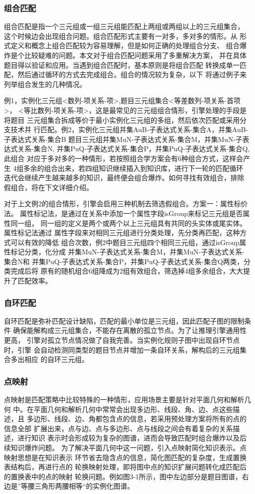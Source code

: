 \documentclass{standalone}
\begin{document}
\subsubsection{组合匹配}
组合匹配是指一个三元组或一组三元组能匹配上两组或两组以上的三元组集合，
这个时候边会出现组合问题。组合匹配形式主要有一对多，多对多的情形。从
形式定义和概念上组合匹配较为容易理解，但是如何正确的处理组合分支、
组合爆炸是个比较疑难的问题。本文对于组合匹配问题采用了多重解决方案，
并在具体题目得以验证和应用。当遇到组合匹配时，基本原则是将组合匹配
转换成单一匹配，然后通过循环的方式去完成组合。组合的情况较为复杂，以下
将通过例子来列举组合发生的几种情况。

例1，实例化三元组<数列-项关系-项>,题目三元组集合{<等差数列-项关系-首项>，
<等比数列-项关系-项>}，这是最常见的三元组组合情形，引擎处理的手段是将题目
三元组集合拆成等价于最小实例化三元组的多组，然后依次匹配或采用分支技术并
行匹配。例2，实例化三元组{并集AuB-子表达式关系-集合A，并集AuB-子表达式关系-集合B}
题目三元组{并集MuN-子表达式关系-集合M，并集MuN-子表达式关系-集合N,
并集PuQ-子表达式关系-集合P，并集PuQ-子表达式关系-集合Q},此组合
对应于多对多的一种情形，若按照组合学方案会有6种组合方式，这样会产生
4组多余的组合出来，若四组知识继续插入到知识库，进行下一轮的匹配循环
迭代会继续产生越来越多的知识，最终便会组合爆炸。如何寻找有效组合，排除
假组合，将在下文详细介绍。

对于上文例2的组合情形，引擎会启用三种机制去筛选假组合。方案一：属性标价法。
属性标记法，是通过在关系中添加一个属性字段isGroup来标记三元组是否属性同一组，
同一组的定义是两个或两个以上三元组具有共同的头实体或尾实体。属性标记法通过
属性字段来对相同三元组进行分类处理，先分类再匹配，这种方式可以有效的降低
组合次数，例2中题目三元组四个相同三元组，通过isGroup属性标记分类，化分成
{并集MuN-子表达式关系-集合M，并集MuN-子表达式关系-集合N}和
{并集PuQ-子表达式关系-集合P，并集PuQ-子表达式关系-集合Q}两类，分类完成后将
原有的随机组合6组降成为2组有效组合，筛选掉4组多余组合，大大提升了匹配效率。
\subsubsection{自环匹配}
自环匹配是弥补匹配设计缺陷，匹配的最小单位是三元组，因此匹配子图的限制条件
确保能解构成三元组集合，不能存在离散的孤立节点。为了让推理引擎通用性更高，
引擎对孤立节点情况做了自我完善。当实例化规则子图中出现自环节点时，引擎
会自动检测同类型的题目节点并增加一条自环关系，解构后的三元组集合多出相应
的自环三元组。
\subsubsection{点映射}
点映射是匹配策略中比较特殊的一种情形，应用场景主要是针对平面几何和解析几何
中。在平面几何和解析几何中常常会出现多边形、线段、角、边、点这些描述，且
多边形、线段、边、角都包含点的信息，若采用预处理方案将所有的点的信息全部
扩展出来，点与边、点与多边形、点与线段之间会有着复杂的关系描述，进行知识
表示时会形成较为复杂的图谱，进而会导致匹配时组合爆炸以及后续知识爆炸问题。
为了解决平面几何中这一问题，引入点映射简化知识表示。点映射思想是在知识表示
环节省去隐含点的信息，简化图匹配的复杂度，生成置换表结构后，再进行点的
轮换映射处理，即将图中点的知识扩展问题转化成匹配后的置换表中的点的映射
轮换问题。例如图3-1所示，图中左边部分是题目图谱，右边是”等腰三角形两腰相等“的实例化图谱。
\end{document}
